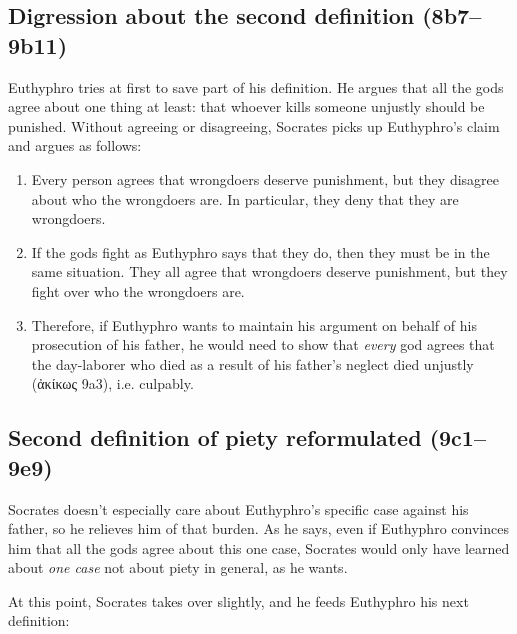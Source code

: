 \documentclass[12pt]{article}
\begin{document}

\subsection{Digression about the second definition (8b7--9b11)}

Euthyphro tries at first to save part of his definition.  He argues that all
the gods agree about one thing at least: that whoever kills someone unjustly
should be punished.  Without agreeing or disagreeing, Socrates picks up
Euthyphro's claim and argues as follows:

\begin{enumerate}

    \item Every person agrees that wrongdoers deserve punishment, but they
        disagree about who the wrongdoers are.  In particular, they deny that
        they are wrongdoers.

    \item If the gods fight as Euthyphro says that they do, then they must be
        in the same situation.  They all agree that wrongdoers deserve
        punishment, but they fight over who the wrongdoers are.

    \item Therefore, if Euthyphro wants to maintain his argument on behalf of
        his prosecution of his father, he would need to show that \emph{every}
        god agrees that the day-laborer who died as a result of his father's
        neglect died unjustly ({\g ἀκίκως} 9a3), i.e. culpably.

\end{enumerate}


\subsection{Second definition of piety reformulated (9c1--9e9)}

Socrates doesn't especially care about Euthyphro's specific case against his
father, so he relieves him of that burden.  As he says, even if Euthyphro
convinces him that all the gods agree about this one case, Socrates would only
have learned about \emph{one case} not about piety in general, as he wants.

At this point, Socrates takes over slightly, and he feeds Euthyphro his next
definition:
\end{document}
